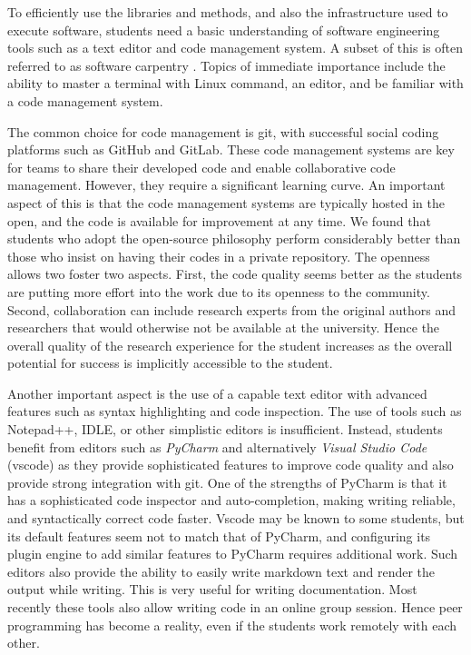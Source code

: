 \documentclass[utf8]{FrontiersinVancouver} %
\begin{document}
To efficiently use the libraries and methods, and also the
infrastructure used to execute software, students need a basic
understanding of software engineering tools such as a text editor and
code management system.  A subset of this is often referred to as
software carpentry \cite{software-carpentry}. Topics of immediate
importance include the ability to master a terminal with Linux command, an editor, and be familiar
with a code management system.

The common choice for code management is git, with successful social
coding platforms such as GitHub and GitLab.  These code management
systems are key for teams to share their developed code and enable
collaborative code management.  However, they require a significant
learning curve. An important aspect of this is that the code
management systems are typically hosted in the open, and the code
is available for improvement at any time. We found that students who
adopt the open-source philosophy perform considerably better than
those who insist on having their codes in a private
repository. The openness allows two foster two aspects. First, the
code quality seems better as the students are putting more effort into
the work due to its openness to the community. Second, collaboration
can include research experts from the original authors and researchers
that would otherwise not be available at the university. Hence the
overall quality of the research experience for the student increases
as the overall potential for success is implicitly accessible to the
student.

Another important aspect is the use of a capable text editor with
advanced features such as syntax highlighting and code inspection. The
use of tools such as Notepad++, IDLE, or other simplistic editors is
insufficient. Instead, students benefit from editors such as {\em
  PyCharm} and alternatively {\em Visual Studio Code} (vscode) as they
provide sophisticated features to improve code quality and also
provide strong integration with git. One of the strengths of PyCharm
is that it has a sophisticated code inspector and auto-completion,
making writing reliable, and syntactically correct code faster. Vscode may be known to some
students, but its default features seem not to match that of PyCharm,
and configuring its plugin engine to add similar features to PyCharm
requires additional work. Such editors also provide the ability to
easily write markdown text and render the output while writing. This
is very useful for writing documentation. Most recently these tools also allow writing code in an online group session. Hence peer programming has become a reality, even if the students work remotely with each other.
\end{document}
